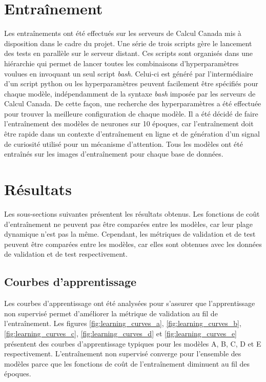 \section{Entraînement}
    Les entraînements ont  été effectués sur les serveurs de Calcul Canada mis à disposition dans le cadre du projet. Une série de trois scripts gère le lancement des tests en parallèle sur le serveur distant. Ces scripts sont organisés dans une hiérarchie qui permet de lancer toutes les combinaisons d'hyperparamètres voulues en invoquant un seul script \textit{bash}. Celui-ci est généré par l'intermédiaire d'un script python ou les hyperparamètres peuvent facilement être spécifiés pour chaque modèle, indépendamment de la syntaxe \textit{bash} imposée par les serveurs de Calcul Canada. De cette façon, une recherche des hyperparamètres a été effectuée pour trouver la meilleure configuration de chaque modèle.
    Il a été décidé de faire l'entraînement des modèles de neurones sur 10 époques, car l'entraînement doit être rapide dans un contexte d'entraînement en ligne et de génération d'un signal de curiosité utilisé pour un mécanisme d'attention. Tous les modèles ont été entraînés sur les images d'entraînement pour chaque base de données.
    
\section{Résultats}
    Les sous-sections suivantes présentent les résultats obtenus. Les fonctions de coût d'entraînement ne peuvent pas être comparées entre les modèles, car leur plage dynamique n'est pas la même. Cependant, les métriques de validation et de test peuvent être comparées entre les modèles, car elles sont obtenues avec les données de validation et de test respectivement.

\subsection{Courbes d'apprentissage}
    Les courbes d'apprentissage ont été analysées pour s'assurer que l'apprentissage non supervisé permet d'améliorer la métrique de validation au fil de l'entraînement. Les figures \ref{fig:learning_curves_a}, \ref{fig:learning_curves_b}, \ref{fig:learning_curves_c}, \ref{fig:learning_curves_d} et \ref{fig:learning_curves_e} présentent des courbes d'apprentissage typiques pour les modèles A, B, C, D et E respectivement. L'entraînement non supervisé converge pour l'ensemble des modèles parce que les fonctions de coût de l'entraînement diminuent au fil des époques.\\

